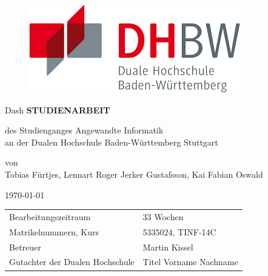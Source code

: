 \begin{figure}[!htb]
%
  \includegraphics[width=\linewidth]{DHBW-Logo.png}
  \label{fig:awesome_image3}
\endminipage
\end{figure}

\begin{center}
\vfill
{\Large Dash}
\vfill
\textbf{STUDIENARBEIT}
\vfill

des Studienganges Angewandte Informatik\\
\vspace{12pt}
an der Dualen Hochschule Baden-Württemberg Stuttgart
\vfill

von\\
\vspace{12pt}
Tobias Fürtjes, Lennart Roger Jerker Gustafsson, Kai Fabian Oswald
\vfill

\today
\vfill

\begin{tabular}{ll}
Bearbeitungszeitraum & 33 Wochen \\
Matrikelnummern, Kurs & 5335024, TINF-14C \\
Betreuer & Martin Kissel \\
Gutachter der Dualen Hochschule	& Titel Vorname Nachname \\
\end{tabular}

\end{center}